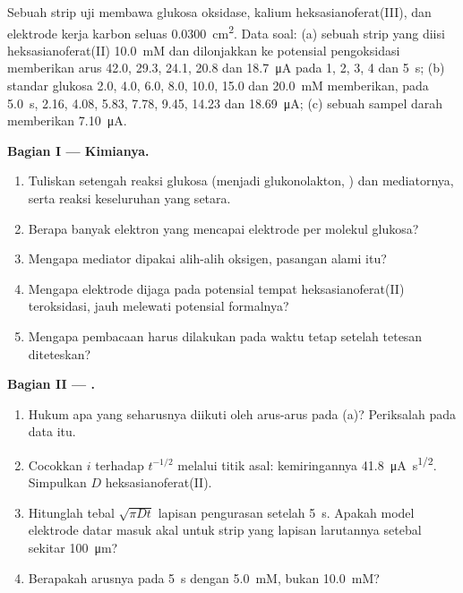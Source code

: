 \begin{problem}
\label{pb:b3:electrode-kinetics:1}
Sebuah strip uji membawa glukosa oksidase, kalium heksasianoferat(III), dan
elektrode kerja karbon seluas \qty{0.0300}{cm^2}. Data soal: (a) sebuah strip
yang diisi heksasianoferat(II) \qty{10.0}{mM} dan dilonjakkan ke potensial
pengoksidasi memberikan arus 42.0, 29.3, 24.1, 20.8 dan \qty{18.7}{\micro A}
pada 1, 2, 3, 4 dan \qty{5}{s}; (b) standar glukosa 2.0, 4.0, 6.0, 8.0, 10.0,
15.0 dan \qty{20.0}{mM} memberikan, pada \qty{5.0}{s}, 2.16, 4.08, 5.83, 7.78,
9.45, 14.23 dan \qty{18.69}{\micro A}; (c) sebuah sampel darah memberikan
\qty{7.10}{\micro A}.

\medskip\noindent\textbf{Bagian I --- Kimianya.}
\begin{enumerate}[beginpenalty=10000]
  \item Tuliskan setengah reaksi glukosa (menjadi glukonolakton, )
        dan mediatornya, serta reaksi keseluruhan yang setara.
  \item Berapa banyak elektron yang mencapai elektrode per molekul glukosa?
  \item Mengapa mediator dipakai alih-alih oksigen, pasangan alami  itu?
  \item Mengapa elektrode dijaga pada potensial tempat heksasianoferat(II)
        teroksidasi, jauh melewati potensial formalnya?
  \item Mengapa pembacaan harus dilakukan pada waktu tetap setelah tetesan
        diteteskan?
\end{enumerate}

\medskip\noindent\textbf{Bagian II --- .}
\begin{enumerate}[resume, beginpenalty=10000]
  \item Hukum apa yang seharusnya diikuti oleh arus-arus pada (a)? Periksalah
        pada data itu.
  \item Cocokkan $i$ terhadap $t^{-1/2}$ melalui titik asal: kemiringannya
        \qty{41.8}{\micro A.s^{1/2}}. Simpulkan $D$ heksasianoferat(II).
  \item Hitunglah tebal $\sqrt{\pi Dt}$ lapisan pengurasan setelah \qty{5}{s}.
        Apakah model elektrode datar masuk akal untuk strip yang lapisan
        larutannya setebal sekitar \qty{100}{\micro m}?
  \item Berapakah arusnya pada \qty{5}{s} dengan \qty{5.0}{mM}, bukan
        \qty{10.0}{mM}?
\end{enumerate}


\end{problem}
